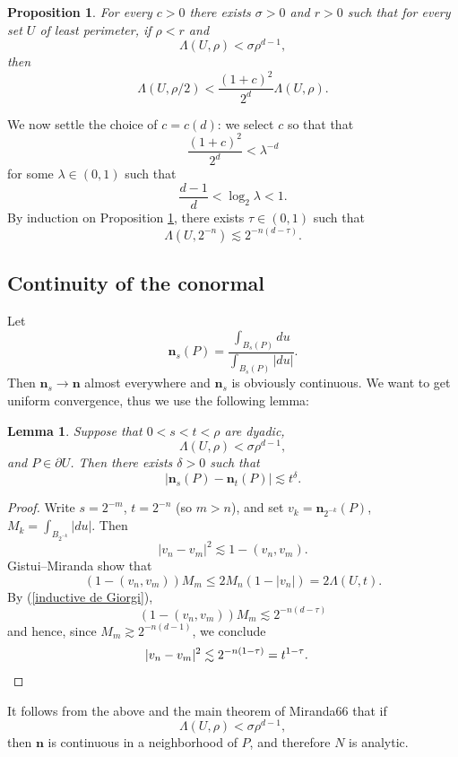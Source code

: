 \documentclass[reqno,12pt,letterpaper]{amsart}
\newcommand{\normal}{\mathbf n}
\newtheorem{lemma}[theorem]{Lemma}
\newtheorem{proposition}[theorem]{Proposition}
\theoremstyle{definition}
\numberwithin{equation}{section}
\begin{document}
\begin{proposition}\label{de Giorgi}
For every $c > 0$ there exists $\sigma > 0$ and $r > 0$ such that for every set $U$ of least perimeter, if
$\rho < r$ and
$$\Lambda(U, \rho) < \sigma \rho^{d - 1},$$
then
$$\Lambda(U, \rho/2) < \frac{(1 + c)^2}{2^d} \Lambda(U, \rho).$$
\end{proposition}

We now settle the choice of $c = c(d)$: we select $c$ so that that
$$\frac{(1 + c)^2}{2^d} < \lambda^{-d}$$
for some $\lambda \in (0, 1)$ such that
$$\frac{d - 1}{d} < \log_2 \lambda < 1.$$
By induction on Proposition \ref{de Giorgi}, there exists $\tau \in (0, 1)$ such that
\begin{equation}\label{inductive de Giorgi}
\Lambda(U, 2^{-n}) \lesssim 2^{-n(d - \tau)}.
\end{equation}

\subsection{Continuity of the conormal}
Let
$$\normal_s(P) = \frac{\int_{B_s(P)} du}{\int_{B_s(P)} |du|}.$$
Then $\normal_s \to \normal$ almost everywhere and $\normal_s$ is obviously continuous.
We want to get uniform convergence, thus we use the following lemma:

\begin{lemma}
Suppose that $0 < s < t < \rho$ are dyadic,
$$\Lambda(U, \rho) < \sigma \rho^{d - 1},$$
and $P \in \partial U$.
Then there exists $\delta > 0$ such that
$$|\normal_s(P) - \normal_t(P)| \lesssim t^\delta.$$
\end{lemma}
\begin{proof}
Write $s = 2^{-m}$, $t = 2^{-n}$ (so $m > n$), and set $v_k = \normal_{2^{-k}}(P)$, $M_k = \int_{B_{2^{-k}}} |du|$.
Then
$$|v_n - v_m|^2 \lesssim 1 - (v_n, v_m).$$
Gistui--Miranda show that
$$(1 - (v_n, v_m))M_m \leq 2M_n(1 - |v_n|) = 2\Lambda(U, t).$$
By (\ref{inductive de Giorgi}),
$$(1 - (v_n, v_m))M_m \lesssim 2^{-n(d - \tau)}$$
and hence, since $M_m \gtrsim 2^{-n(d - 1)}$, we conclude
\begin{align*}
|v_n - v_m|^2 &\lesssim 2^{-n(1 - \tau)} = t^{1 - \tau}. \qedhere
\end{align*}
\end{proof}

It follows from the above and the main theorem of Miranda66 that if
$$\Lambda(U, \rho) < \sigma \rho^{d - 1},$$
then $\normal$ is continuous in a neighborhood of $P$, and therefore $N$ is analytic.
\end{document}
